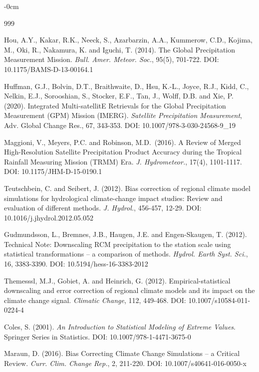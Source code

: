\documentclass[remotesensing,article,submit,pdftex,moreauthors]{Definitions/mdpi}
\begin{document}
\begin{adjustwidth}{-\extralength}{0cm}


\begin{thebibliography}{999}


 Hou, A.Y., Kakar, R.K., Neeck, S., Azarbarzin, A.A., Kummerow,
C.D., Kojima, M., Oki, R., Nakamura, K. and Iguchi, T. (2014). The
Global Precipitation Measurement Mission. \emph{Bull. Amer. Meteor.
Soc.}, 95(5), 701-722. DOI: 10.1175/BAMS-D-13-00164.1

 Huffman, G.J., Bolvin, D.T., Braithwaite, D., Hsu, K.-L., Joyce,
R.J., Kidd, C., Nelkin, E.J., Sorooshian, S., Stocker, E.F., Tan, J.,
Wolff, D.B. and Xie, P. (2020). Integrated Multi-satellitE Retrievals
for the Global Precipitation Measurement (GPM) Mission (IMERG).
\emph{Satellite Precipitation Measurement}, Adv. Global Change Res., 67,
343-353. DOI: 10.1007/978-3-030-24568-9\_19

 Maggioni, V., Meyers, P.C. and Robinson, M.D.~(2016). A Review
of Merged High-Resolution Satellite Precipitation Product Accuracy
during the Tropical Rainfall Measuring Mission (TRMM) Era. \emph{J.
Hydrometeor.}, 17(4), 1101-1117. DOI: 10.1175/JHM-D-15-0190.1

 Teutschbein, C. and Seibert, J. (2012). Bias correction of
regional climate model simulations for hydrological climate-change
impact studies: Review and evaluation of different methods. \emph{J.
Hydrol.}, 456-457, 12-29. DOI: 10.1016/j.jhydrol.2012.05.052

 Gudmundsson, L., Bremnes, J.B., Haugen, J.E. and Engen-Skaugen,
T. (2012). Technical Note: Downscaling RCM precipitation to the station
scale using statistical transformations -- a comparison of methods.
\emph{Hydrol. Earth Syst. Sci.}, 16, 3383-3390. DOI:
10.5194/hess-16-3383-2012

 Themesssl, M.J., Gobiet, A. and Heinrich, G. (2012).
Empirical-statistical downscaling and error correction of regional
climate models and its impact on the climate change signal.
\emph{Climatic Change}, 112, 449-468. DOI: 10.1007/s10584-011-0224-4

 Coles, S. (2001). \emph{An Introduction to Statistical Modeling
of Extreme Values}. Springer Series in Statistics. DOI:
10.1007/978-1-4471-3675-0

 Maraun, D. (2016). Bias Correcting Climate Change Simulations --
a Critical Review. \emph{Curr. Clim. Change Rep.}, 2, 211-220. DOI:
10.1007/s40641-016-0050-x


\end{thebibliography}
\end{adjustwidth}
\end{document}
